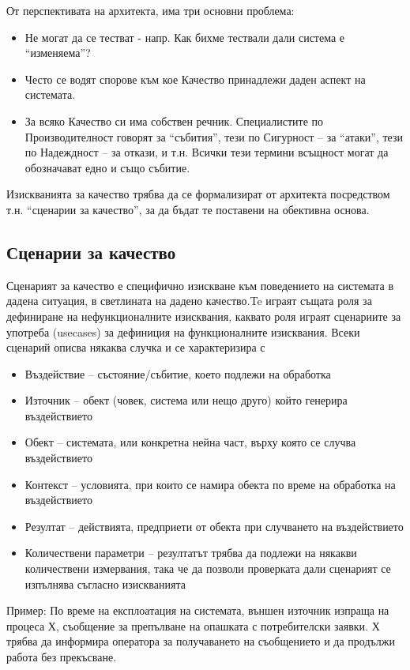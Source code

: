 \documentclass[fleqn,12pt]{article}
\begin{document}
От перспективата на архитекта, има три основни проблема:
\begin {itemize}
\item Не могат да се тестват - напр. Как бихме тествали дали система е “изменяема”?
\item Често се водят спорове към кое Качество принадлежи даден аспект на системата.
\item За всяко Качество си има собствен речник. Специалистите по Производителност говорят за “събития”, тези по Сигурност – за “атаки”, тези по Надеждност – за откази, и т.н. Всички тези термини всъщност могат да обозначават едно и също събитие.
\end {itemize}

Изискванията за качество трябва да се формализират от архитекта посредством т.н. “сценарии за качество”, за да бъдат те поставени на обективна основа. 

\subsection {Сценарии за качество}
Сценарият за качество е специфично изискване към поведението на системата в дадена ситуация, в светлината на дадено качество.Te играят същата роля за дефиниране на нефункционалните изисквания, каквато роля играят сценариите за употреба (usecases) за дефиниция на функционалните изисквания.  Всеки сценарий описва някаква случка и се характеризира с 
\begin {itemize}
\item Въздействие – състояние/събитие, което подлежи на обработка 
\item Източник – обект (човек, система или нещо друго) който генерира въздействието
\item Обект – системата, или конкретна нейна част, върху която се случва въздействието
\item Контекст – условията, при които се намира обекта по време на обработка на въздействието
\item Резултат – действията, предприети от обекта при случването на въздействието
\item Количествени параметри – резултатът трябва да подлежи на някакви количествени измервания, така че да позволи проверката дали сценарият се изпълнява съгласно изискванията
\end{itemize}
Пример: По време на експлоатация на системата, външен източник изпраща на процеса Х, съобщение за препълване на опашката с потребителски заявки. Х трябва да информира оператора за получаването на съобщението и да продължи работа без прекъсване.
\end{document}
